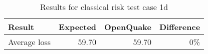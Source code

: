 \begin{table}[htbp]

\centering
\begin{tabular}{ l r r r }

\hline
\rowcolor{anti-flashwhite}
\bf{Result} & \bf{Expected} & \bf{OpenQuake} & \bf{Difference}\\
\hline
Average loss & 59.70 & 59.70 & 0\% \\
\hline
\end{tabular}

\caption{Results for classical risk test case 1d}
\label{tab:result-cr-1d}
\end{table}